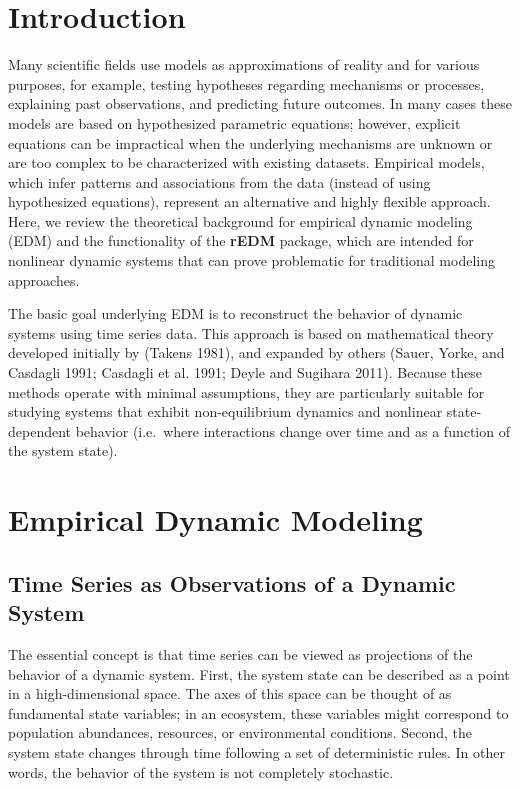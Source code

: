 \documentclass[]{article}
\begin{document}
\hypertarget{introduction}{%
\section{Introduction}\label{introduction}}

Many scientific fields use models as approximations of reality and for
various purposes, for example, testing hypotheses regarding mechanisms
or processes, explaining past observations, and predicting future
outcomes. In many cases these models are based on hypothesized
parametric equations; however, explicit equations can be impractical
when the underlying mechanisms are unknown or are too complex to be
characterized with existing datasets. Empirical models, which infer
patterns and associations from the data (instead of using hypothesized
equations), represent an alternative and highly flexible approach. Here,
we review the theoretical background for empirical dynamic modeling
(EDM) and the functionality of the \textbf{rEDM} package, which are
intended for nonlinear dynamic systems that can prove problematic for
traditional modeling approaches.

The basic goal underlying EDM is to reconstruct the behavior of dynamic
systems using time series data. This approach is based on mathematical
theory developed initially by (Takens 1981), and expanded by others
(Sauer, Yorke, and Casdagli 1991; Casdagli et al. 1991; Deyle and
Sugihara 2011). Because these methods operate with minimal assumptions,
they are particularly suitable for studying systems that exhibit
non-equilibrium dynamics and nonlinear state-dependent behavior
(i.e.~where interactions change over time and as a function of the
system state).

\hypertarget{empirical-dynamic-modeling}{%
\section{Empirical Dynamic Modeling}\label{empirical-dynamic-modeling}}

\hypertarget{time-series-as-observations-of-a-dynamic-system}{%
\subsection{Time Series as Observations of a Dynamic
System}\label{time-series-as-observations-of-a-dynamic-system}}

The essential concept is that time series can be viewed as projections
of the behavior of a dynamic system. First, the system state can be
described as a point in a high-dimensional space. The axes of this space
can be thought of as fundamental state variables; in an ecosystem, these
variables might correspond to population abundances, resources, or
environmental conditions. Second, the system state changes through time
following a set of deterministic rules. In other words, the behavior of
the system is not completely stochastic.
\end{document}
